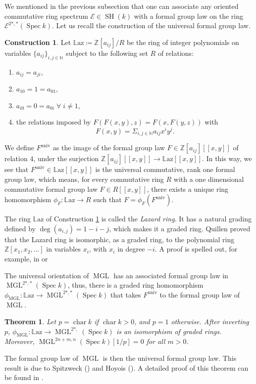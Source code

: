 \documentclass[10pt]{amsart}
\theoremstyle{definition}
\newtheorem{constr}[defn]{Construction}
\theoremstyle{plain}
\newtheorem{thm}[defn]{Theorem}
\numberwithin{equation}{section}
\newcommand{\0}{\emptyset}
\newcommand{\sE}{{\mathcal E}}
\newcommand{\N}{{\mathbb N}}
\newcommand{\Z}{{\mathbb Z}}
\newcommand{\MGL}{{\operatorname{MGL}}}
\newcommand{\Spec}{{\operatorname{Spec}}}
\newcommand{\SH}{{\operatorname{SH}}}
\renewcommand{\deg}{{\operatorname{deg}}}
\newcommand{\chr}{{\operatorname{char}}}
\newcommand{\Laz}{{\mathbb{L} \text{az}}}
\begin{document}
We mentioned in the previous subsection that one can associate any oriented commutative ring spectrum $\sE \in \SH(k)$ with a formal group law on the ring $\sE^{2*,*}(\Spec k)$. Let us recall the construction of the universal formal group law. 
\begin{constr}
\label{constr:lazardring}
    Let $\Laz \coloneqq \Z[a_{ij}]/R$ be the ring of integer polynomials on variables $\{a_{ij}\}_{i,j \in \N}$ subject to the following set $R$ of relations:
    \begin{enumerate}
        \item $a_{ij}=a_{ji}$,
        \item $a_{10}=1=a_{01}$,
        \item $a_{i0}=0=a_{0i} \; \forall \; i \neq 1$,
        \item the relations imposed by $F(F(x,y),z)=F(x,F(y,z))$ with 
        $$F(x,y)=\Sigma_{i,j \in \N}a_{ij}x^iy^j.$$
    \end{enumerate}
We define $F^{\text{univ}}$ as the image of the formal group law $F\in \Z[a_{ij}][[x,y]]$ of relation $4$, under the surjection $\Z[a_{ij}][[x,y]]\to \Laz[[x,y]]$. In this way, we see that $F^{\text{univ}}\in \Laz[[x,y]]$ is the universal commutative, rank one formal group law, which means, for every commutative ring $R$ with a one dimensional commutative formal group law $F \in R[[x,y]]$, there exists a unique ring homomorphism $\phi_F:\Laz \to R$ such that $F=\phi_F(F^{\text{univ}})$. 
\end{constr}

The ring $\Laz$ of Construction \ref{constr:lazardring} is called the \emph{Lazard ring}. It has a natural grading defined by $\deg(a_{i,j})=1-i-j$, which makes it a graded ring. Quillen proved that the Lazard ring is isomorphic, as a graded ring, to the polynomial ring $\Z[x_1, x_2, \ldots]$ in variables $x_i$, with $x_i$ in degree $-i$. A proof is spelled out, for example, in \cite[Part II, Theorem 7.1]{Adams:homotopy} or \cite[Theorem 4.4.9]{koch:bordism}

The universal orientation of $\MGL$ has an associated formal group law in $\MGL^{2*,*}(\Spec k)$, thus, there is a graded ring homomorphism $\phi_{\MGL}:\Laz \to \MGL^{2*,*}(\Spec k)$ that takes $F^{\text{univ}}$ to the formal group law of $\MGL$.

\begin{thm}
\label{thm:comparisonLazard}
    Let $p= \chr k$ if $\chr k>0$, and $p=1$ otherwise. After inverting $p$, $\phi_{\MGL}:\Laz \to \MGL^{2*,}(\Spec k)$ is an isomorphism of graded rings. Moreover, $\MGL^{2n+m,n}(\Spec k)[1/p]=0$ for all $m>0$.
\end{thm}
The formal group law of $\MGL$ is then the universal formal group law. This result is due to Spitzweck (\cite{Spitzweck:AlgCob}) and Hoyois (\cite{Hoyois:AlgCob}). A detailed proof of this theorem can be found in \cite[Theorem 2.1]{lev:ellcoh}.
\end{document}
